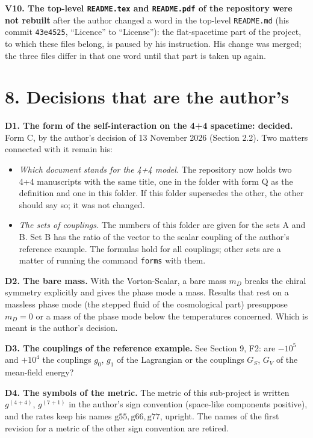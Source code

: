 \documentclass[
  10pt,
]{article}
\providecommand{\tightlist}{%
  \setlength{\itemsep}{0pt}\setlength{\parskip}{0pt}}
\begin{document}
\textbf{V10. The top-level \texttt{README.tex} and \texttt{README.pdf}
of the repository were not rebuilt} after the author changed a word in
the top-level \texttt{README.md} (his commit \texttt{43e4525},
``Licence'' to ``License''): the flat-spacetime part of the project, to
which these files belong, is paused by his instruction. His change was
merged; the three files differ in that one word until that part is taken
up again.

\hypertarget{decisions-that-are-the-authors}{%
\section{8. Decisions that are the
author's}\label{decisions-that-are-the-authors}}

\textbf{D1. The form of the self-interaction on the 4+4 spacetime:
decided.} Form C, by the author's decision of 13 November 2026 (Section
2.2). Two matters connected with it remain his:

\begin{itemize}
\tightlist
\item
  \emph{Which document stands for the 4+4 model.} The repository now
  holds two 4+4 manuscripts with the same title, one in the folder with
  form Q as the definition and one in this folder. If this folder
  supersedes the other, the other should say so; it was not changed.
\item
  \emph{The sets of couplings.} The numbers of this folder are given for
  the sets A and B. Set B has the ratio of the vector to the scalar
  coupling of the author's reference example. The formulas hold for all
  couplings; other sets are a matter of running the command
  \texttt{forms} with them.
\end{itemize}

\textbf{D2. The bare mass.} With the Vorton-Scalar, a bare mass \(m_D\)
breaks the chiral symmetry explicitly and gives the phase mode a mass.
Results that rest on a massless phase mode (the stepped fluid of the
cosmological part) presuppose \(m_D=0\) or a mass of the phase mode
below the temperatures concerned. Which is meant is the author's
decision.

\textbf{D3. The couplings of the reference example.} See Section 9, F2:
are \(-10^5\) and \(+10^4\) the couplings \(g_0\), \(g_1\) of the
Lagrangian or the couplings \(G_S\), \(G_V\) of the mean-field energy?

\textbf{D4. The symbols of the metric.} The metric of this sub-project
is written \(g^{(4+4)}\), \(g^{(7+1)}\) in the author's sign convention
(space-like components positive), and the rates keep his names
\(\mathrm{g55},\mathrm{g66},\mathrm{g77}\), upright. The names of the
first revision for a metric of the other sign convention are retired.
\end{document}
